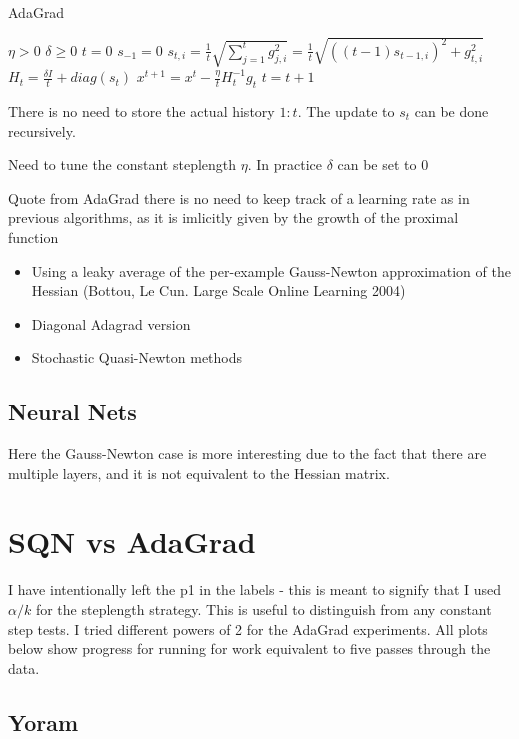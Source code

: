 \documentclass[12pt]{article}
\begin{document}
\begin{algorithm}[H]
\caption{AdaGrad}
\label{alg1}
\begin{algorithmic}[1]
\REQUIRE  $\eta>0$ $\delta \geq 0$
\STATE  $t=0$ $s_{-1}=0$
\STATE $s_{t,i} = \frac{1}{t} \sqrt{   \sum_{j=1}^t g_{j,i}^2   }  =\frac{1}{t} \sqrt{ ((t-1) s_{t-1,i})^2 +g_{t,i}^2 }  $
\STATE $H_t = \frac{\delta I}{t} + diag(s_t)$
\STATE $x^{t+1} = x^t - \frac{\eta}{t} H_t^{-1} g_t$
\STATE $t=t+1$
\ENDWHILE
\end{algorithmic}
\end{algorithm}

There is no need to store the actual history $1:t$. The update to $s_t$ can be done recursively. 

Need to tune the constant steplength $\eta$. In practice $\delta$ can be set to 0

Quote from AdaGrad there is no need to keep track of a learning rate as in previous algorithms, as it is imlicitly given by the growth of the proximal function

\begin{itemize}
	\item Using a leaky average of the per-example Gauss-Newton approximation of the Hessian (Bottou, Le Cun. Large Scale Online Learning 2004)
	\item Diagonal Adagrad version
	\item Stochastic Quasi-Newton methods
\end{itemize}

\subsection{Neural Nets}
Here the Gauss-Newton case is more interesting due to the fact that there are multiple layers, and it is not equivalent to the Hessian matrix. 


\section{SQN vs AdaGrad}

I have intentionally left the p1 in the labels - this is meant to signify that I used $\alpha/k$ for the steplength strategy. This is useful to distinguish from any constant step tests. I tried different powers of 2 for the AdaGrad experiments. All plots below show progress for running for work equivalent to five passes through the data. 

\subsection{Yoram}
\end{document}

